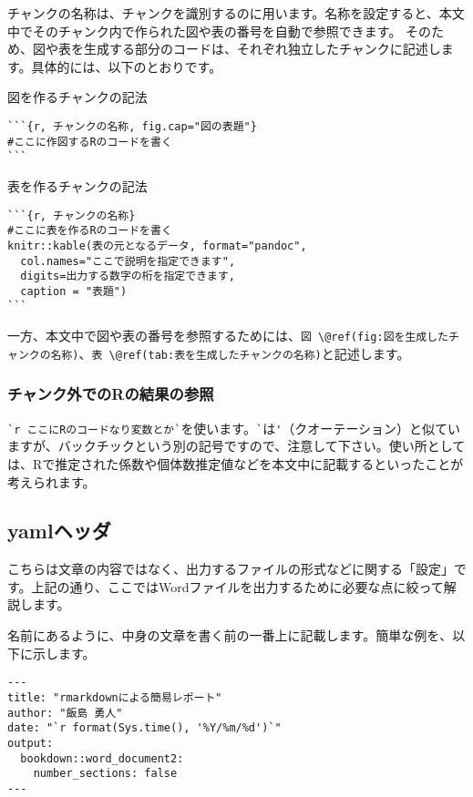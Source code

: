チャンクの名称は、チャンクを識別するのに用います。名称を設定すると、本文中でそのチャンク内で作られた図や表の番号を自動で参照できます。
そのため、図や表を生成する部分のコードは、それぞれ独立したチャンクに記述します。具体的には、以下のとおりです。

\begin{itembox}[l]{図を作るチャンクの記法}
\begin{verbatim}
```{r, チャンクの名称, fig.cap="図の表題"}
#ここに作図するRのコードを書く
```
\end{verbatim}
\end{itembox}

\begin{itembox}[l]{表を作るチャンクの記法}
\begin{verbatim}
```{r, チャンクの名称}
#ここに表を作るRのコードを書く
knitr::kable(表の元となるデータ, format="pandoc",
  col.names="ここで説明を指定できます",
  digits=出力する数字の桁を指定できます,
  caption = "表題")
```
\end{verbatim}
\end{itembox}

一方、本文中で図や表の番号を参照するためには、\verb|図 \@ref(fig:図を生成したチャンクの名称)|、\verb|表 \@ref(tab:表を生成したチャンクの名称)|と記述します。

   \subsubsection{チャンク外でのRの結果の参照}
\verb|`r ここにRのコードなり変数とか`|を使います。\verb|`|は\verb|'|（クオーテーション）と似ていますが、バックチックという別の記号ですので、注意して下さい。使い所としては、Rで推定された係数や個体数推定値などを本文中に記載するといったことが考えられます。

    \subsection{yamlヘッダ}
こちらは文章の内容ではなく、出力するファイルの形式などに関する「設定」です。上記の通り、ここではWordファイルを出力するために必要な点に絞って解説します。

名前にあるように、中身の文章を書く前の一番上に記載します。簡単な例を、以下に示します。
\begin{verbatim}
---
title: "rmarkdownによる簡易レポート"
author: "飯島 勇人"
date: "`r format(Sys.time(), '%Y/%m/%d')`"
output:
  bookdown::word_document2:
    number_sections: false
---
\end{verbatim}

